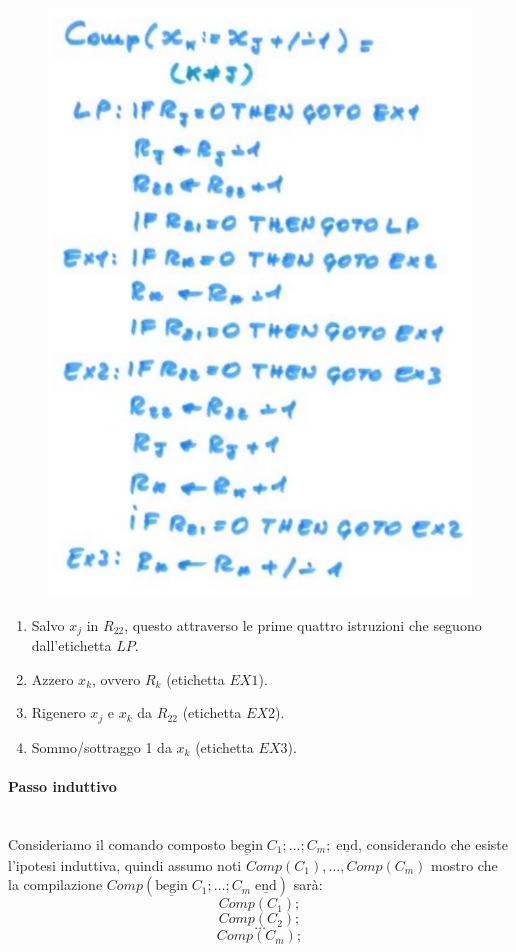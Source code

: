 \documentclass{article}
\begin{document}
\begin{itemize}
          \begin{figure}[H]
              \centering
              \includegraphics[scale=0.4]{images/assegnamento_ram2.png}
          \end{figure}
          \begin{enumerate}
              \item Salvo $x_j$ in $R_{22}$, questo attraverso le prime quattro istruzioni che seguono
              dall'etichetta $LP$.
              \item Azzero $x_k$, ovvero $R_k$ (etichetta $EX1$).
              \item Rigenero $x_j$ e $x_k$ da $R_{22}$ (etichetta $EX2$).
              \item Sommo/sottraggo 1 da $x_k$ (etichetta $EX3$).
          \end{enumerate}

          \paragraph{Passo induttivo}\mbox{}\\
          Consideriamo il comando composto $\underline{\text{begin}}\;C_1;...;C_m;\;\underline{\text{end}}$,
          considerando che esiste l'ipotesi induttiva, quindi assumo noti $Comp(C_1),\dots ,Comp(C_m)$
          mostro che la compilazione $Comp(\underline{\text{begin}}\;C_1;\dots;C_m\;\underline{\text{end}})$
          sarà:
          $$Comp(C_1);$$
          $$Comp(C_2);$$
          $$\dots$$
          $$Comp(C_m);$$


\end{itemize}
\end{document}
